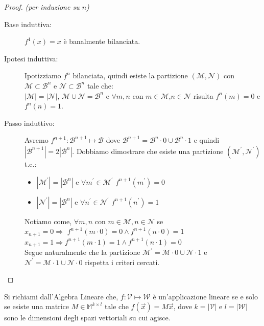 \documentclass[12pt,a4paper,openright]{report}
\begin{document}
\begin{proof}
    \textit{(per induzione su $n$)\\}
    \begin{description}
        \item[Base induttiva:] $f^1(x)=x$ è banalmente bilanciata.
        \item[Ipotesi induttiva:] Ipotizziamo $f^n$ bilanciata, quindi esiste la partizione $(\mathcal{M},\mathcal{N})$ con $\mathcal{M}\subset\mathcal{B}^n$ e $\mathcal{N}\subset\mathcal{B}^n$ tale che:\\
                                      ${\left\vert{\mathcal{M}}\right\vert} = {\left\vert{\mathcal{N}}\right\vert}$, $\mathcal{M} \cup \mathcal{N} = \mathcal{B}^n$ e $\forall m,n$ con
                                      $m\in\mathcal{M}$,$n \in\mathcal{N}$ risulta $f^n(m) = 0$ e $ f^n(n) = 1$.
        \item[Passo induttivo:] Avremo $f^{n+1}:\mathcal{B}^{n+1}\mapsto\mathcal{B}$ dove  $\mathcal{B}^{n+1} = \mathcal{B}^n\cdot0 \cup \mathcal{B}^n\cdot1$ e quindi\\
                                     $\left\vert\mathcal{B}^{n+1}\right\vert = 2\left\vert\mathcal{B}^{n}\right\vert$. Dobbiamo dimostrare che esiste una partizione
                                     $(\mathcal{M^\prime},\mathcal{N^\prime})$ t.c.:
                                     \begin{itemize}
                                        \item $\left\vert\mathcal{M^\prime}\right\vert=\left\vert\mathcal{B}^{n}\right\vert$ e $\forall m^\prime \in \mathcal{M^\prime}$ $f^{n+1}(m^\prime) = 0$ 
                                        \item $\left\vert\mathcal{N^\prime}\right\vert=\left\vert\mathcal{B}^{n}\right\vert$ e $\forall n^\prime \in \mathcal{N^\prime}$ $f^{n+1}(n^\prime) = 1$   
                                      \end{itemize}
                                      Notiamo come, $\forall m,n$ con $ m\in\mathcal{M},n\in\mathcal{N}$ se\\
                                      $x_{n+1} = 0 \Rightarrow $ $f^{n+1}(m\cdot0)=0 \land f^{n+1}(n\cdot0)=1$\\
                                      $x_{n+1} = 1 \Rightarrow $$f^{n+1}(m\cdot1)=1 \land f^{n+1}(n\cdot1)=0$\\
                                      Segue naturalmente che la partizione $\mathcal{M^\prime} = \mathcal{M}\cdot0 \cup \mathcal{N}\cdot1$ e $\mathcal{N^\prime} = \mathcal{M}\cdot1 \cup \mathcal{N}\cdot0$
                                      rispetta i criteri cercati. 
    \end{description}      
\end{proof}
\par
Si richiami dall'Algebra Lineare che, $f:\mathcal{V}\mapsto\mathcal{W}$ è un'applicazione lineare se e solo se esiste una matrice $M \in \mathbb{M}^{k \times l}$ tale che $f(\vec{x})=M\vec{x}$, dove $k = \left\vert\mathcal{V}\right\vert$ e $l = \left\vert\mathcal{W}\right\vert$ sono le dimensioni degli spazi vettoriali su cui agisce.\\
\end{document}
